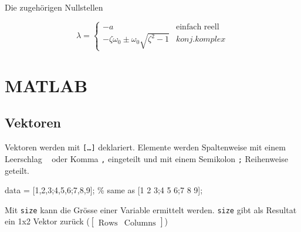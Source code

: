 \documentclass[
  10pt,
  a4paper,
  german]{article}
\newenvironment{Shaded}{}{}
\newcommand{\CommentTok}[1]{\textcolor[rgb]{0.42,0.45,0.49}{#1}}
\newcommand{\FloatTok}[1]{\textcolor[rgb]{0.00,0.36,0.77}{#1}}
\newcommand{\NormalTok}[1]{\textcolor[rgb]{0.14,0.16,0.18}{#1}}
\newcommand{\OperatorTok}[1]{\textcolor[rgb]{0.14,0.16,0.18}{#1}}
\newcommand{\VariableTok}[1]{\textcolor[rgb]{0.89,0.38,0.04}{#1}}
\numberwithin{equation}{section}
\begin{document}
\begin{multicols}{2}
Die zugehörigen Nullstellen

\[
\lambda = \left\{ \begin{matrix}
-a & \text{einfach reell} \\
-\zeta\omega_0 \pm \omega_0 \sqrt{\zeta^2-1} & konj. komplex
\end{matrix}\right.
\]

\hypertarget{matlab}{%
\section{MATLAB}\label{matlab}}

\hypertarget{vektoren}{%
\subsection{Vektoren}\label{vektoren}}

Vektoren werden mit \texttt{{[}…{]}} deklariert. Elemente werden
Spaltenweise mit einem Leerschlag
\texttt{\textquotesingle{}\ \textquotesingle{}} oder Komma \texttt{,}
eingeteilt und mit einem Semikolon \texttt{;} Reihenweise geteilt.

\begin{Shaded}
\begin{Highlighting}[]
\VariableTok{data} \OperatorTok{=}\NormalTok{ [}\FloatTok{1}\OperatorTok{,}\FloatTok{2}\OperatorTok{,}\FloatTok{3}\OperatorTok{;}\FloatTok{4}\OperatorTok{,}\FloatTok{5}\OperatorTok{,}\FloatTok{6}\OperatorTok{;}\FloatTok{7}\OperatorTok{,}\FloatTok{8}\OperatorTok{,}\FloatTok{9}\NormalTok{]}\OperatorTok{;} \CommentTok{\% same as [1 2 3;4 5 6;7 8 9];}
\end{Highlighting}
\end{Shaded}

\begin{tcolorbox}[enhanced jigsaw, rightrule=.15mm, colback=white, arc=.35mm, colbacktitle=quarto-callout-note-color!10!white, bottomrule=.15mm, colframe=quarto-callout-note-color-frame, leftrule=.75mm, coltitle=black, breakable, titlerule=0mm, toptitle=1mm, bottomtitle=1mm, opacityback=0, title=\textcolor{quarto-callout-note-color}{\faInfo}\hspace{0.5em}{Grösse \texttt{size}}, toprule=.15mm, left=2mm, opacitybacktitle=0.6]

Mit \texttt{size} kann die Grösse einer Variable ermittelt werden.
\texttt{size} gibt als Resultat ein 1x2 Vektor zurück
(\(\begin{bmatrix}\text{Rows} & \text{Columns}\end{bmatrix}\))


\end{tcolorbox}
\end{multicols}
\end{document}

